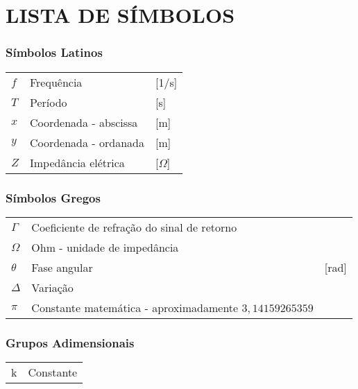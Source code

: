 




\chapter*{LISTA DE SÍMBOLOS}




\subsection*{Símbolos Latinos}

\begin{tabular}{p{}p{}>{\PreserveBacklash\raggedleft}p{}}
$f$ & Frequência  & {[}1/s{]}\tabularnewline
$T$ & Período & {[}s{]} \tabularnewline
$x$ & Coordenada - abscissa & {[}m{]} \tabularnewline
$y$ & Coordenada - ordanada & {[}m{]} \tabularnewline
$Z$ & Impedância elétrica & {[}$\Omega${]} \tabularnewline
\end{tabular}


\subsection*{Símbolos Gregos}

\begin{tabular}{p{}p{}>{\PreserveBacklash\raggedleft}p{}}
$\Gamma$ & Coeficiente de refração do sinal de retorno \tabularnewline
$\Omega$ & Ohm - unidade de impedância \tabularnewline
$\theta$ & Fase angular & {[}rad{]} \tabularnewline
$\Delta$ & Variação \tabularnewline
$\pi$ & Constante matemática - aproximadamente $3,14159265359$ \tabularnewline
\end{tabular}


\subsection*{Grupos Adimensionais}

\begin{tabular}{p{}p{}}
k & Constante\tabularnewline
\end{tabular}


